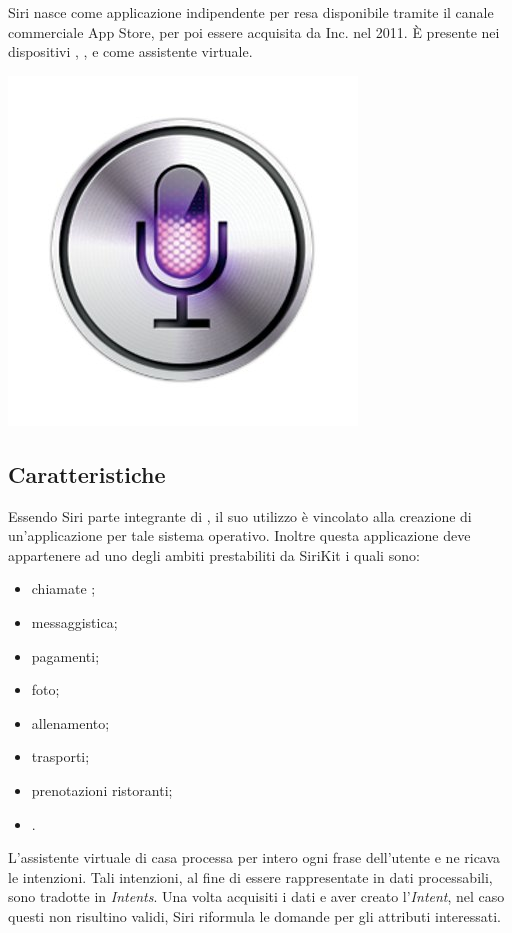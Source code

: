 \documentclass[a4paper,titlepage]{article}
\begin{document}
	\begin{minipage}{0.7\textwidth}\raggedright
		Siri nasce come applicazione indipendente per  resa disponibile tramite il canale commerciale App Store, per poi essere acquisita da  Inc. nel 2011. È presente nei dispositivi , ,  e  come assistente virtuale.
	\end{minipage}
	\hfill
	\noindent\begin{minipage}{0.1\textwidth}
		\includegraphics[scale=0.3]{images/siri.jpg}
	\end{minipage}
	\subsection{Caratteristiche}
		Essendo Siri parte integrante di , il suo utilizzo è vincolato alla creazione di un'applicazione per tale sistema operativo. Inoltre questa applicazione deve appartenere ad uno degli ambiti prestabiliti da SiriKit i quali sono:
			\begin{itemize}
				\item chiamate ;
				\item messaggistica;
				\item pagamenti;
				\item foto;
				\item allenamento;
				\item trasporti;
				\item prenotazioni ristoranti;
				\item {}.
			\end{itemize}
		L'assistente virtuale di casa  processa per intero ogni frase dell'utente e ne ricava le intenzioni. Tali intenzioni, al fine di essere rappresentate in dati processabili, sono tradotte in \textit{Intents}. Una volta acquisiti i dati e aver creato l'\textit{Intent}, nel caso questi non risultino validi, Siri riformula le domande per gli attributi interessati.
\newpage
\end{document}
